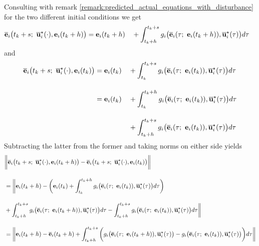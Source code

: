 \begin{gg_box}
Consulting with remark \eqref{remark:predicted_actual_equations_with_disturbance}
for the two different initial conditions we get
\begin{alignat}{2}
  \overline{\vect{e}}_i\big(t_k + s;\ \overline{\vect{u}}_i^{\star}(\cdot), \vect{e}_i(t_k +h)\big)
    &= \vect{e}_i(t_k +h)
    &&+ \int_{t_k +h}^{t_k + s} g_i\big(\overline{\vect{e}}_i(\tau;\ \vect{e}_i(t_k + h)), \overline{\vect{u}}_i^{\star}(\tau)\big) d\tau
\end{alignat}
and
\begin{alignat}{2}
  \overline{\vect{e}}_i\big(t_k + s;\ \overline{\vect{u}}_i^{\star}(\cdot), \vect{e}_i(t_k)\big)
    &= \vect{e}_i(t_k)
    &&+ \int_{t_k}^{t_k + s} g_i\big(\overline{\vect{e}}_i(\tau;\ \vect{e}_i(t_k)), \overline{\vect{u}}_i^{\star}(\tau)\big) d\tau \\[2.5ex]
  &= \vect{e}_i(t_k)
    &&+ \int_{t_k}^{t_k + h} g_i\big(\overline{\vect{e}}_i(\tau;\ \vect{e}_i(t_k)), \overline{\vect{u}}_i^{\star}(\tau)\big) d\tau \\[2.5ex]
  & &&+ \int_{t_k + h}^{t_k + s} g_i\big(\overline{\vect{e}}_i(\tau;\ \vect{e}_i(t_k)), \overline{\vect{u}}_i^{\star}(\tau)\big) d\tau
\end{alignat}
Subtracting the latter from the former and taking norms on either side yields
\begin{align}
  &\bigg \| \overline{\vect{e}}_i\big(t_k + s;\ \overline{\vect{u}}_i^{\star}(\cdot), \vect{e}_i(t_k +h)\big)
    -\overline{\vect{e}}_i\big(t_k + s;\ \overline{\vect{u}}_i^{\star}(\cdot), \vect{e}_i(t_k)\big) \bigg \| \\[2.5ex]
    &= \bigg\| \vect{e}_i(t_k +h)
 - \bigg( \vect{e}_i(t_k) + \int_{t_k}^{t_k + h} g_i\big(\overline{\vect{e}}_i(\tau;\ \vect{e}_i(t_k)), \overline{\vect{u}}_i^{\star}(\tau)\big) d\tau \bigg) \\[2.5ex]
 &+ \int_{t_k +h}^{t_k + s} g_i\big(\overline{\vect{e}}_i(\tau;\ \vect{e}_i(t_k + h)), \overline{\vect{u}}_i^{\star}(\tau)\big) d\tau
    - \int_{t_k + h}^{t_k + s} g_i\big(\overline{\vect{e}}_i(\tau;\ \vect{e}_i(t_k)), \overline{\vect{u}}_i^{\star}(\tau)\big) d\tau \bigg\| \\[2.5ex]
    &= \bigg\| \vect{e}_i(t_k +h) - \overline{\vect{e}}_i(t_k + h)
    + \int_{t_k +h}^{t_k + s} \bigg( g_i\big(\overline{\vect{e}}_i(\tau;\ \vect{e}_i(t_k + h)), \overline{\vect{u}}_i^{\star}(\tau)\big)
    -  g_i\big(\overline{\vect{e}}_i(\tau;\ \vect{e}_i(t_k)), \overline{\vect{u}}_i^{\star}(\tau)\big) \bigg) d\tau \bigg\| \\[2.5ex]

\end{align}
\end{gg_box}
